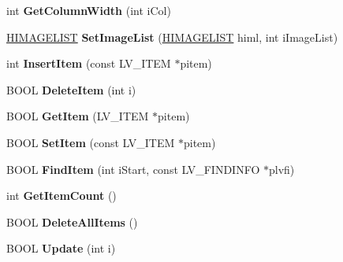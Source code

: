 \begin{DoxyCompactItemize}
\item 
\mbox{\label{class_c_list_view_a4501847f0e72c2d23f5c262a6559ce84}} 
int {\bfseries Get\+Column\+Width} (int i\+Col)
\item 
\mbox{\label{class_c_list_view_a5d5d3218d21648ece771b5da8cd5114c}} 
\hyperlink{struct___i_m_a_g_e_l_i_s_t}{H\+I\+M\+A\+G\+E\+L\+I\+ST} {\bfseries Set\+Image\+List} (\hyperlink{struct___i_m_a_g_e_l_i_s_t}{H\+I\+M\+A\+G\+E\+L\+I\+ST} himl, int i\+Image\+List)
\item 
\mbox{\label{class_c_list_view_a215e03d1d5e243e7e9ed2bbfa816ab60}} 
int {\bfseries Insert\+Item} (const L\+V\+\_\+\+I\+T\+EM $\ast$pitem)
\item 
\mbox{\label{class_c_list_view_ac4c70db70c3e0d50c526b0adae9ad920}} 
B\+O\+OL {\bfseries Delete\+Item} (int i)
\item 
\mbox{\label{class_c_list_view_a9d931c93b4ac674d208b6ff182c514ed}} 
B\+O\+OL {\bfseries Get\+Item} (L\+V\+\_\+\+I\+T\+EM $\ast$pitem)
\item 
\mbox{\label{class_c_list_view_ad564ba87ee9e77132f00cd21e26b7081}} 
B\+O\+OL {\bfseries Set\+Item} (const L\+V\+\_\+\+I\+T\+EM $\ast$pitem)
\item 
\mbox{\label{class_c_list_view_a2ec1d45439d460503e0564b2ec100519}} 
B\+O\+OL {\bfseries Find\+Item} (int i\+Start, const L\+V\+\_\+\+F\+I\+N\+D\+I\+N\+FO $\ast$plvfi)
\item 
\mbox{\label{class_c_list_view_a36af60cda2a37a976e1a57e1fe74ffe3}} 
int {\bfseries Get\+Item\+Count} ()
\item 
\mbox{\label{class_c_list_view_a140e9aca4a29e64731d740fdb0837c9b}} 
B\+O\+OL {\bfseries Delete\+All\+Items} ()
\item 
\mbox{\label{class_c_list_view_a9fa369465dd24fbcfd63e1b53023bf32}} 
B\+O\+OL {\bfseries Update} (int i)
\item 
\mbox{\label{class_c_list_view_aa46a94e7c8e0e870a7e0ac81ba8cbdd1}} 

\end{DoxyCompactItemize}
